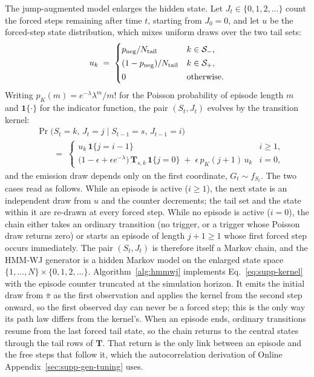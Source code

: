 The jump-augmented model enlarges the hidden state. Let
$J_t \in \{0, 1, 2, \dots\}$ count the forced steps remaining after
time $t$, starting from $J_0 = 0$, and let $u$ be the forced-step
state distribution, which
mixes uniform draws over the two tail sets:
\begin{equation}
  u_k \;=\;
  \begin{cases}
    p_{\rm neg}/N_{\rm tail} & k \in \mathcal{S}_{-},\\[2pt]
    (1 - p_{\rm neg})/N_{\rm tail} & k \in \mathcal{S}_{+},\\[2pt]
    0 & \text{otherwise}.
  \end{cases}
  \label{eq:supp-u}
\end{equation}
Writing $p_K(m) = e^{-\lambda} \lambda^m / m!$ for the Poisson
probability of episode length $m$ and $\mathbf{1}\{\cdot\}$ for the
indicator function, the pair $(S_t, J_t)$ evolves by the transition
kernel:
\begin{equation}
\begin{aligned}
  &\Pr\big(S_t = k,\, J_t = j \mid S_{t-1} = s,\, J_{t-1} = i\big) \\
  &\qquad=\;
  \begin{cases}
    u_k\, \mathbf{1}\{j = i - 1\} & i \ge 1,\\[6pt]
    \big(1 - \epsilon + \epsilon e^{-\lambda}\big)\,
      \mathbf{T}_{s, k}\, \mathbf{1}\{j = 0\}
      \;+\; \epsilon\, p_K(j + 1)\, u_k & i = 0,
  \end{cases}
\end{aligned}
  \label{eq:supp-kernel}
\end{equation}
and the emission draw depends only on the first coordinate,
$G_t \sim f_{S_t}$. The two cases read as follows. While an episode is
active ($i \ge 1$), the next state is an independent draw from $u$ and
the counter decrements; the tail set and the state within it are
re-drawn at every forced step. While no episode is active ($i = 0$),
the chain either takes an ordinary transition (no trigger, or a
trigger whose Poisson draw returns zero) or starts an episode of
length $j + 1 \ge 1$ whose first forced step occurs immediately. The
pair $(S_t, J_t)$ is therefore itself a Markov chain, and the HMM-WJ
generator is a hidden Markov model on the enlarged state space
$\{1, \dots, N\} \times \{0, 1, 2, \dots\}$. Algorithm~\ref{alg:hmmwj}
implements Eq.~\eqref{eq:supp-kernel} with the episode counter
truncated at the simulation horizon. It emits the initial draw from
$\bar\pi$ as the first observation and applies the kernel from the
second step onward, so the first observed day can never be a forced
step; this is the only way its path law differs from the kernel's.
When an episode ends, ordinary transitions resume from the last forced
tail state, so the chain returns to the central states through the
tail rows of $\mathbf{T}$. That return is the only link between an
episode and the free steps that follow it, which the autocorrelation
derivation of Online Appendix~\ref{sec:supp-gen-tuning} uses.

